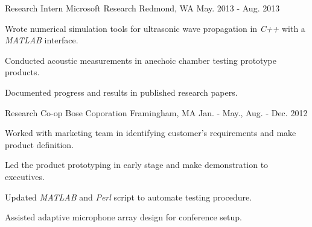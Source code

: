 \begin{cventries}
  \cventry
    {Research Intern} %
    {Microsoft Research} %
    {Redmond, WA} %
    {May. 2013 - Aug. 2013} %
    {
      \begin{cvitems} %
        \item {Wrote numerical simulation tools for ultrasonic wave propagation in \textit{C++} with a \textit{MATLAB} interface.}
        \item {Conducted acoustic measurements in anechoic chamber testing prototype products.}
        \item {Documented progress and results in published research papers.}
      \end{cvitems}
    }

  \cventry
    {Research Co-op} %
    {Bose Coporation} %
    {Framingham, MA} %
    {Jan. - May., Aug. - Dec. 2012} %
    {
      \begin{cvitems} %
        \item {Worked with marketing team in identifying customer's requirements and make product definition.}
        \item {Led the product prototyping in early stage and make demonstration to executives.}
        \item {Updated \textit{MATLAB} and \textit{Perl} script to automate testing procedure.}
        \item {Assisted adaptive microphone array design for conference setup.}
      \end{cvitems}
    }

\end{cventries}
